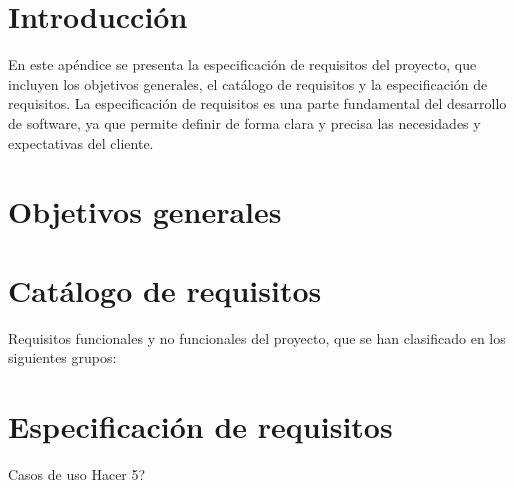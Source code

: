 
\section{Introducción}

En este apéndice se presenta la especificación de requisitos del proyecto, que incluyen los objetivos generales, el catálogo de requisitos y la especificación de requisitos. La especificación de requisitos es una parte fundamental del desarrollo de software, ya que permite definir de forma clara y precisa las necesidades y expectativas del cliente.




\section{Objetivos generales}

\section{Catálogo de requisitos}
Requisitos funcionales y no funcionales del proyecto, que se han clasificado en los siguientes grupos:



\section{Especificación de requisitos}

Casos de uso
Hacer 5?

